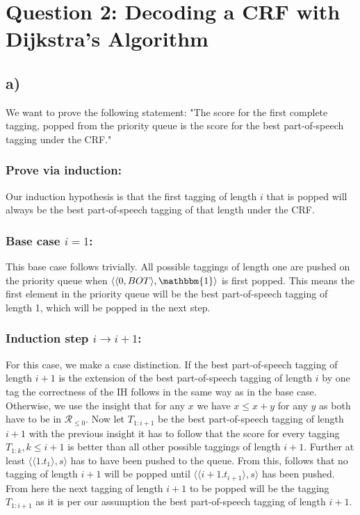 \documentclass[a4paper,12pt]{ETHexercise}
\begin{document}
\section*{Question 2: Decoding a CRF with Dijkstra's Algorithm}
\subsection*{a)}
We want to prove the following statement: "The score for the first complete tagging, popped from the priority queue is the score for the best part-of-speech tagging under the CRF."

\subsubsection*{Prove via induction:}

Our induction hypothesis is that the first tagging of length $i$ that is popped will always be the best part-of-speech tagging of that length under the CRF.

\subsubsection*{Base case $i=1$:}

This base case follows trivially. All possible taggings of length one are pushed on the priority queue when $\langle \langle 0, BOT \rangle, \mathbbm{1} \rangle$ is first popped. This means the first element in the priority queue will be the best part-of-speech tagging of length 1, which will be popped in the next step.

\subsubsection*{Induction step $i \rightarrow i+1$:}

For this case, we make a case distinction. If the best part-of-speech tagging of length $i+1$ is the extension of the best part-of-speech tagging of length $i$ by one tag the correctness of the IH follows in the same way as in the base case.
Otherwise, we use the insight that for any $x$ we have $x \leq x+y$ for any $y$ as both have to be in $\mathcal{R}_{\leq 0}$.
Now let $T_{1:i+1}$ be the best part-of-speech tagging of length $i+1$ with the previous insight it has to follow that the score for every tagging $T_{1:k}, k \leq i+1$ is better than all other possible taggings of length $i+1$. Further at least $\langle \langle 1. t_1 \rangle, s \rangle$ has to have been pushed to the queue. From this, follows that no tagging of length $i+1$ will be popped until $\langle \langle i+1. t_{i+1} \rangle, s \rangle$ has been pushed. From here the next tagging of length $i+1$ to be popped will be the tagging $T_{1:i+1}$ as it is per our assumption the best part-of-speech tagging of length $i+1$.
\end{document}
